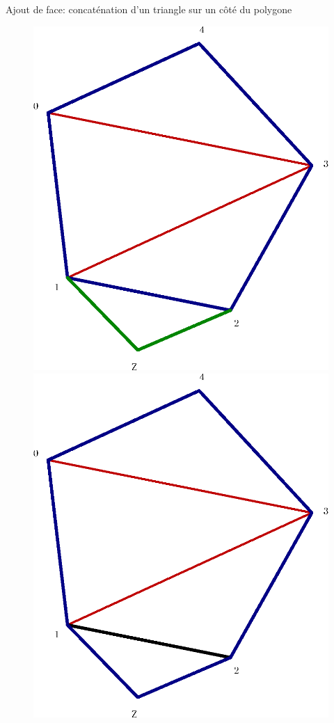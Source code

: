 \documentclass[french,xcolor=dvipsnames]{beamer}
\begin{document}
		\begin{frame}			
			Ajout de face: concaténation d'un triangle sur un côté du polygone
			\begin{figure}
				\includegraphics[scale=0.3]{exemple_triangu_ajoute_face_debut.eps}
				\includegraphics[scale=0.3]{exemple_triangu_ajoute_face_fin.eps}

\end{figure}
\end{frame}
\end{document}
